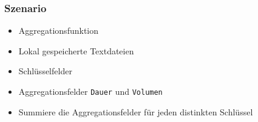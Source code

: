 \documentclass[presentation, shownotes]{beamer}
\begin{document}

\begin{frame}
\frametitle{Szenario}
\begin{itemize}
\setlength\itemsep{1em}
\item Aggregationsfunktion
\item Lokal gespeicherte Textdateien
\item Schlüsselfelder
\item Aggregationsfelder \texttt{Dauer} und \texttt{Volumen}
\item Summiere die Aggregationsfelder für jeden distinkten Schlüssel
\end{itemize}
\end{frame}




\end{document}
